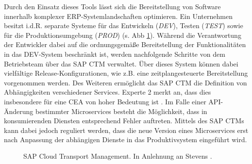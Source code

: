 Durch den Einsatz dieses Tools lässt sich die Bereitstellung von Software innerhalb komplexer ERP-Systemlandschaften optimieren. Ein Unternehmen besitzt i.d.R. separate Systeme für das Entwickeln (\textit{DEV}), Testen (\textit{TEST}) sowie für die Produktionsumgebung (\textit{PROD}) (s. Abb \ref{fig:CTM}). Während die Verantwortung der Entwickler dabei auf die ordnungsgemäße Bereitstellung der Funktionalitäten in das DEV-System beschränkt ist, werden nachfolgende Schritte von dem Betriebsteam über das SAP CTM verwaltet. Über dieses System können dabei vielfältige Release-Konfigurationen, wie z.B. eine zeitplangesteuerte Bereitstellung vorgenommen werden. Des Weiteren ermöglicht das SAP CTM die Definition von Abhängigkeiten verschiedener Services. Experte 2 merkt an, dass dies insbesondere für eine CEA von hoher Bedeutung ist \cite[Z. 67 ff.]{ProductManagerSAPHyperspaceCICD.}. Im Falle einer API-Änderung bestimmter Microservices besteht die Möglichkeit, dass in konsumierenden Diensten entsprechend Fehler auftreten. Mittels des SAP CTMs kann dabei jedoch reguliert werden, dass die neue Version eines Microservices erst nach Anpassung der abhängigen Dienste in das Produktivsystem eingeführt wird.
\begin{center}
	\begin{figure}[H]
		\centering
		\caption[SAP Cloud Transport Management]{SAP Cloud Transport Management. In Anlehnung an Stevens \cite{.20230327}.}
		\label{fig:CTM}
	\end{figure}
\end{center}
\vspace*{-15mm}
